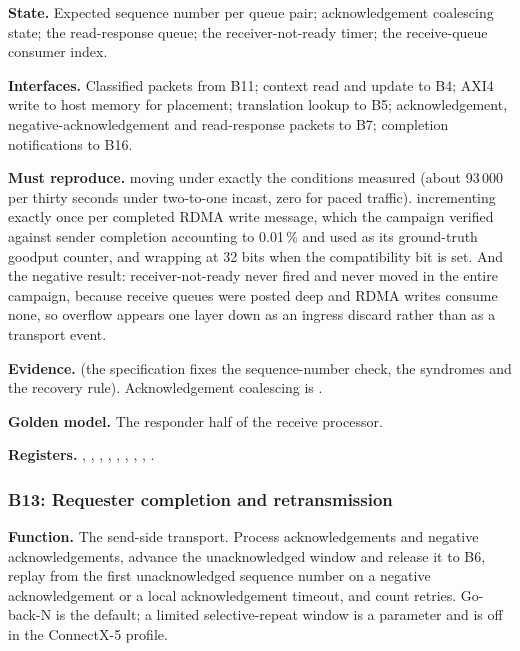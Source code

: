 \textbf{State.} Expected sequence number per queue pair; acknowledgement
coalescing state; the read-response queue; the receiver-not-ready timer; the
receive-queue consumer index.

\textbf{Interfaces.} Classified packets from B11; context read and update to
B4; AXI4 write to host memory for placement; translation lookup to B5;
acknowledgement, negative-acknowledgement and read-response packets to B7;
completion notifications to B16.

\textbf{Must reproduce.}  moving under exactly the
conditions measured (about 93\,000 per thirty seconds under two-to-one incast,
zero for paced traffic).  incrementing exactly once
per completed RDMA write message, which the campaign verified against sender
completion accounting to 0.01\,\% and used as its ground-truth goodput counter,
and wrapping at 32 bits when the compatibility bit is set. And the negative
result: receiver-not-ready never fired and  never moved in
the entire campaign, because receive queues were posted deep and RDMA writes
consume none, so overflow appears one layer down as an ingress discard rather
than as a transport event.

\textbf{Evidence.} \evdoc{} (the specification fixes the sequence-number check,
the syndromes and the recovery rule). Acknowledgement coalescing is \evcal{}.

\textbf{Golden model.} The responder half of the receive processor.

{\raggedright
\textbf{Registers.} , ,
, ,
, , ,
, .\par}

\subsubsection{B13: Requester completion and retransmission}

\textbf{Function.} The send-side transport. Process acknowledgements and
negative acknowledgements, advance the unacknowledged window and release it to
B6, replay from the first unacknowledged sequence number on a negative
acknowledgement or a local acknowledgement timeout, and count retries.
Go-back-N is the default; a limited selective-repeat window is a parameter and
is off in the ConnectX-5 profile.

